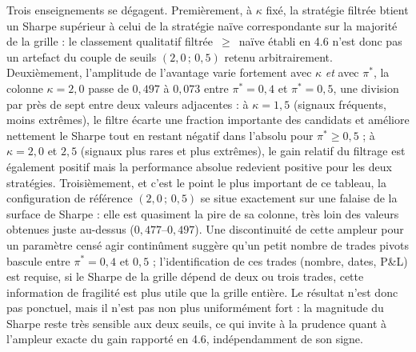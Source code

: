 \documentclass{article}
\begin{document}
Trois enseignements se dégagent. Premièrement, à $\kappa$ fixé, la stratégie filtrée btient un Sharpe supérieur à celui de la stratégie naïve correspondante sur la majorité de la grille : le classement qualitatif filtrée~$\geq$~naïve établi en 4.6 n'est donc pas un artefact du couple de seuils $(2{,}0\,;\,0{,}5)$ retenu arbitrairement. Deuxièmement, l'amplitude de l'avantage varie fortement avec $\kappa$ \emph{et} avec $\pi^\ast$, la colonne $\kappa=2{,}0$ passe de $0{,}497$ à $0{,}073$ entre $\pi^\ast=0{,}4$ et $\pi^\ast=0{,}5$, une division par près de sept entre deux valeurs adjacentes : à $\kappa=1{,}5$ (signaux fréquents, moins extrêmes), le filtre écarte une fraction importante des candidats et améliore nettement le Sharpe tout en restant négatif dans l'absolu pour $\pi^\ast\geq 0{,}5$ ; à $\kappa=2{,}0$ et $2{,}5$ (signaux plus rares et plus extrêmes), le gain relatif du filtrage est également positif mais la performance absolue redevient positive pour les deux stratégies. Troisièmement, et c'est le point le plus important de ce tableau, la configuration de référence $(2{,}0\,;\,0{,}5)$ se situe exactement sur une falaise de la surface de Sharpe : elle est quasiment la pire de sa colonne, très loin des valeurs obtenues juste au-dessus ($0{,}477$--$0{,}497$). Une discontinuité de cette ampleur pour un paramètre censé agir continûment suggère qu'un petit nombre de trades pivots bascule entre $\pi^\ast=0{,}4$ et $0{,}5$ ; l'identification de ces trades (nombre, dates, P\&L) est requise, si le Sharpe de la grille dépend de deux ou trois trades, cette information de fragilité est plus utile que la grille entière. Le résultat n'est donc pas ponctuel, mais il n'est pas non plus uniformément fort : la magnitude du Sharpe reste très sensible aux deux seuils, ce qui invite à la prudence quant à l'ampleur exacte du gain rapporté en 4.6, indépendamment de son signe.
\end{document}

